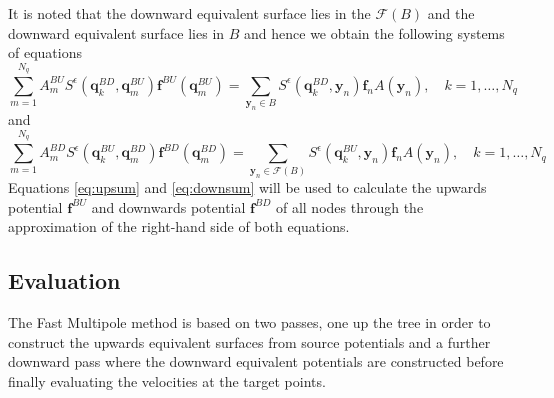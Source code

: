 It is noted that the downward equivalent surface lies in the $\mathcal{F}(B)$ and the downward equivalent surface lies in $B$ and hence we obtain the following systems of equations
\begin{equation}
\label{eq:upsum}
    \sum_{m=1}^{N_{q}} A_{m}^{BU} S^\epsilon\left(\bm{q}^{BD}_{k}, \bm{q}_{m}^{B U}\right) \bm{f}^{B U}\left(\bm{q}_{m}^{B U}\right)=\sum_{{\bm{y}}_{n} \in B} S^\epsilon\left(\bm{q}^{BD}_{k}, {\bm{y}}_{n}\right) {\bm{f}}_{n} A({\bm{y}}_n), \quad k=1,\dots,N_q
\end{equation}
and
\begin{equation}
\label{eq:downsum}
    \sum_{m=1}^{N_{q}} A_{m}^{BD} S^\epsilon\left(\bm{q}^{BU}_{k}, \bm{q}_{m}^{B D}\right) \bm{f}^{B D}\left(\bm{q}_{m}^{B D}\right)=\sum_{{\bm{y}}_{n} \in \mathcal{F}(B)} S^\epsilon\left(\bm{q}^{BU}_{k}, {\bm{y}}_{n}\right) {\bm{f}}_{n} A({\bm{y}}_n), \quad k=1,\dots,N_q
\end{equation}
Equations \ref{eq:upsum} and \ref{eq:downsum} will be used to calculate the upwards potential $\bm{f}^{B U}$ and downwards potential $\bm{f}^{B D}$ of all nodes through the approximation of the right-hand side of both equations.

\subsection{Evaluation}
The Fast Multipole method is based on two passes, one up the tree in order to construct the upwards equivalent surfaces from source potentials and a further downward pass where the downward equivalent potentials are constructed before finally evaluating the velocities at the target points.

